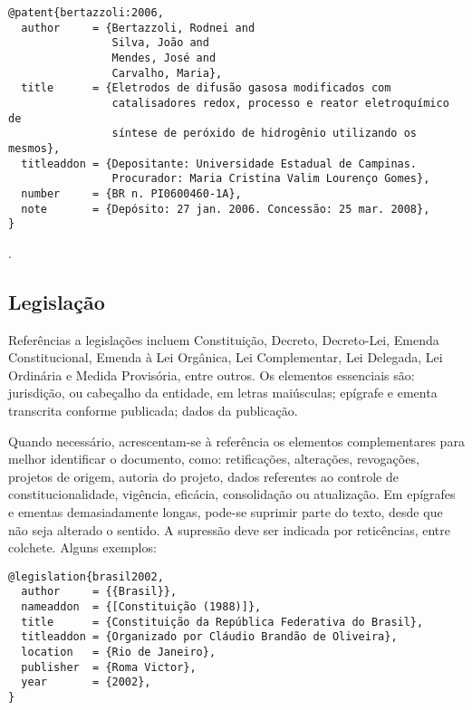\vspace*{1em}

\begin{verbatim}
@patent{bertazzoli:2006,
  author     = {Bertazzoli, Rodnei and
                Silva, João and
                Mendes, José and
                Carvalho, Maria},
  title      = {Eletrodos de difusão gasosa modificados com
                catalisadores redox, processo e reator eletroquímico de
                síntese de peróxido de hidrogênio utilizando os mesmos},
  titleaddon = {Depositante: Universidade Estadual de Campinas.
                Procurador: Maria Cristina Valim Lourenço Gomes},
  number     = {BR n. PI0600460-1A},
  note       = {Depósito: 27 jan. 2006. Concessão: 25 mar. 2008},
}
\end{verbatim}

\noindent
{}.

\subsection{Legislação}

Referências a legislações incluem Constituição, Decreto, Decreto-Lei, Emenda Constitucional, Emenda à Lei Orgânica, Lei Complementar, Lei Delegada, Lei Ordinária e Medida Provisória, entre outros.
Os elementos essenciais são: jurisdição, ou cabeçalho da entidade, em letras maiúsculas; epígrafe e ementa transcrita conforme publicada; dados da publicação.

Quando necessário, acrescentam-se à referência os elementos complementares para melhor identificar o documento, como: retificações, alterações, revogações, projetos de origem,
autoria do projeto, dados referentes ao controle de constitucionalidade, vigência, eficácia, consolidação ou atualização.
Em epígrafes e ementas demasiadamente longas, pode-se suprimir parte do texto, desde que não seja alterado o sentido. A supressão deve ser indicada por reticências, entre colchete.
Alguns exemplos:

\vspace*{1em}

\begin{verbatim}
@legislation{brasil2002,
  author     = {{Brasil}},
  nameaddon  = {[Constituição (1988)]},
  title      = {Constituição da República Federativa do Brasil},
  titleaddon = {Organizado por Cláudio Brandão de Oliveira},
  location   = {Rio de Janeiro},
  publisher  = {Roma Victor},
  year       = {2002},
}
\end{verbatim}

